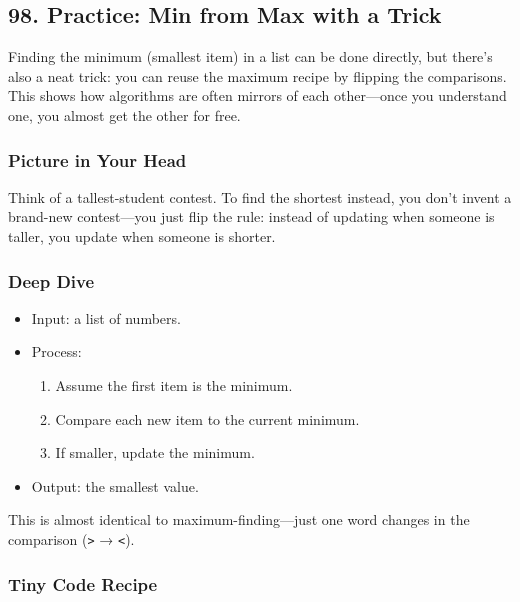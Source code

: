 \documentclass[
  letterpaper,
  DIV=11,
  numbers=noendperiod]{scrreprt}
\providecommand{\tightlist}{%
  \setlength{\itemsep}{0pt}\setlength{\parskip}{0pt}}
\begin{document}
\subsection{98. Practice: Min from Max with a
Trick}\label{practice-min-from-max-with-a-trick}

Finding the minimum (smallest item) in a list can be done directly, but
there's also a neat trick: you can reuse the maximum recipe by flipping
the comparisons. This shows how algorithms are often mirrors of each
other---once you understand one, you almost get the other for free.

\subsubsection{Picture in Your Head}\label{picture-in-your-head-98}

Think of a tallest-student contest. To find the shortest instead, you
don't invent a brand-new contest---you just flip the rule: instead of
updating when someone is taller, you update when someone is shorter.

\subsubsection{Deep Dive}\label{deep-dive-68}

\begin{itemize}
\item
  Input: a list of numbers.
\item
  Process:

  \begin{enumerate}
  \def\labelenumi{\arabic{enumi}.}
  \tightlist
  \item
    Assume the first item is the minimum.
  \item
    Compare each new item to the current minimum.
  \item
    If smaller, update the minimum.
  \end{enumerate}
\item
  Output: the smallest value.
\end{itemize}

This is almost identical to maximum-finding---just one word changes in
the comparison (\texttt{\textgreater{}} → \texttt{\textless{}}).

\subsubsection{Tiny Code Recipe}\label{tiny-code-recipe-96}
\end{document}
